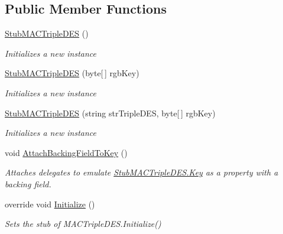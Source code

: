\subsection*{Public Member Functions}
\begin{DoxyCompactItemize}
\item 
\hyperlink{class_system_1_1_security_1_1_cryptography_1_1_fakes_1_1_stub_m_a_c_triple_d_e_s_a0046ba50d65a6594f86bff7a585c0c43}{Stub\-M\-A\-C\-Triple\-D\-E\-S} ()
\begin{DoxyCompactList}\small\item\em Initializes a new instance\end{DoxyCompactList}\item 
\hyperlink{class_system_1_1_security_1_1_cryptography_1_1_fakes_1_1_stub_m_a_c_triple_d_e_s_aa552735608f46d4371a4f238c1a1fe78}{Stub\-M\-A\-C\-Triple\-D\-E\-S} (byte\mbox{[}$\,$\mbox{]} rgb\-Key)
\begin{DoxyCompactList}\small\item\em Initializes a new instance\end{DoxyCompactList}\item 
\hyperlink{class_system_1_1_security_1_1_cryptography_1_1_fakes_1_1_stub_m_a_c_triple_d_e_s_acc355942b1c2d1c0ac9bc056f4247ca0}{Stub\-M\-A\-C\-Triple\-D\-E\-S} (string str\-Triple\-D\-E\-S, byte\mbox{[}$\,$\mbox{]} rgb\-Key)
\begin{DoxyCompactList}\small\item\em Initializes a new instance\end{DoxyCompactList}\item 
void \hyperlink{class_system_1_1_security_1_1_cryptography_1_1_fakes_1_1_stub_m_a_c_triple_d_e_s_aefad1cac5f7eea385ce653d6d99f3265}{Attach\-Backing\-Field\-To\-Key} ()
\begin{DoxyCompactList}\small\item\em Attaches delegates to emulate \hyperlink{class_system_1_1_security_1_1_cryptography_1_1_fakes_1_1_stub_m_a_c_triple_d_e_s_a0f32d056a5ea106b731bbda67b5f2885}{Stub\-M\-A\-C\-Triple\-D\-E\-S.\-Key} as a property with a backing field.\end{DoxyCompactList}\item 
override void \hyperlink{class_system_1_1_security_1_1_cryptography_1_1_fakes_1_1_stub_m_a_c_triple_d_e_s_a7bbcc1bd89c5127540cc12f002415401}{Initialize} ()
\begin{DoxyCompactList}\small\item\em Sets the stub of M\-A\-C\-Triple\-D\-E\-S.\-Initialize()\end{DoxyCompactList}\end{DoxyCompactItemize}
